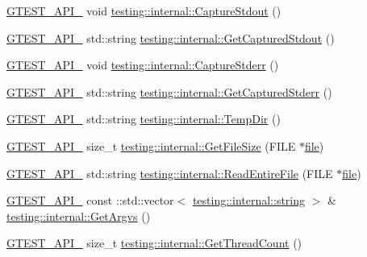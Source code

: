 \begin{DoxyCompactItemize}
\item 
\hyperlink{gtest-port_8h_aa73be6f0ba4a7456180a94904ce17790}{G\+T\+E\+S\+T\+\_\+\+A\+P\+I\+\_\+} void \hyperlink{namespacetesting_1_1internal_acba06d4f0343dec407738ba5544af990}{testing\+::internal\+::\+Capture\+Stdout} ()
\item 
\hyperlink{gtest-port_8h_aa73be6f0ba4a7456180a94904ce17790}{G\+T\+E\+S\+T\+\_\+\+A\+P\+I\+\_\+} std\+::string \hyperlink{namespacetesting_1_1internal_aed657219a9856a8d249a3230de0c54ce}{testing\+::internal\+::\+Get\+Captured\+Stdout} ()
\item 
\hyperlink{gtest-port_8h_aa73be6f0ba4a7456180a94904ce17790}{G\+T\+E\+S\+T\+\_\+\+A\+P\+I\+\_\+} void \hyperlink{namespacetesting_1_1internal_a8ec00d458d0d442bd64af7b5f9c22dda}{testing\+::internal\+::\+Capture\+Stderr} ()
\item 
\hyperlink{gtest-port_8h_aa73be6f0ba4a7456180a94904ce17790}{G\+T\+E\+S\+T\+\_\+\+A\+P\+I\+\_\+} std\+::string \hyperlink{namespacetesting_1_1internal_a374156401da17704099d0c33fa53adfb}{testing\+::internal\+::\+Get\+Captured\+Stderr} ()
\item 
\hyperlink{gtest-port_8h_aa73be6f0ba4a7456180a94904ce17790}{G\+T\+E\+S\+T\+\_\+\+A\+P\+I\+\_\+} std\+::string \hyperlink{namespacetesting_1_1internal_a59a959f437bd7d515b5c41dcf00229c9}{testing\+::internal\+::\+Temp\+Dir} ()
\item 
\hyperlink{gtest-port_8h_aa73be6f0ba4a7456180a94904ce17790}{G\+T\+E\+S\+T\+\_\+\+A\+P\+I\+\_\+} size\+\_\+t \hyperlink{namespacetesting_1_1internal_a06ca3f65f5e85c9ce7299b9e4cd52408}{testing\+::internal\+::\+Get\+File\+Size} (F\+I\+LE $\ast$\hyperlink{_07copy_08_2_read_camera_model_8m_a151631b2fd2bb776ef06c9f440a7ed74}{file})
\item 
\hyperlink{gtest-port_8h_aa73be6f0ba4a7456180a94904ce17790}{G\+T\+E\+S\+T\+\_\+\+A\+P\+I\+\_\+} std\+::string \hyperlink{namespacetesting_1_1internal_a2cc0be60c54a8701423fe5297e1349ee}{testing\+::internal\+::\+Read\+Entire\+File} (F\+I\+LE $\ast$\hyperlink{_07copy_08_2_read_camera_model_8m_a151631b2fd2bb776ef06c9f440a7ed74}{file})
\item 
\hyperlink{gtest-port_8h_aa73be6f0ba4a7456180a94904ce17790}{G\+T\+E\+S\+T\+\_\+\+A\+P\+I\+\_\+} const \+::std\+::vector$<$ \hyperlink{namespacetesting_1_1internal_a8e8ff5b11e64078831112677156cb111}{testing\+::internal\+::string} $>$ \& \hyperlink{namespacetesting_1_1internal_a344160f771a3b754fa4e54b6e9846b23}{testing\+::internal\+::\+Get\+Argvs} ()
\item 
\hyperlink{gtest-port_8h_aa73be6f0ba4a7456180a94904ce17790}{G\+T\+E\+S\+T\+\_\+\+A\+P\+I\+\_\+} size\+\_\+t \hyperlink{namespacetesting_1_1internal_a3b9b3649cd04558bf46c75de52a7ef34}{testing\+::internal\+::\+Get\+Thread\+Count} ()

\end{DoxyCompactItemize}
